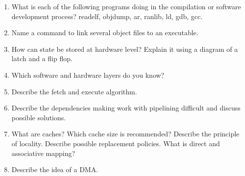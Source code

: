 \documentclass[a4paper,twocolumn]{article}
\begin{document}
\begin{enumerate}
    \item What is each of the following programs doing in the compilation
          or software development process? readelf, objdump, ar, ranlib, ld,
          gdb, gcc.
    \item Name a command to link several object files to an executable.
    \item How can state be stored at hardware level? Explain it using a diagram
          of a latch and a flip flop.
    \item Which software and hardware layers do you know?
    \item Describe the fetch and execute algorithm.
    \item Describe the dependencies making work with pipelining difficult
          and discuss possible solutions.
    \item What are caches? Which cache size is recommended? Describe the
          principle of locality. Describe possible replacement policies.
          What is direct and associative mapping?
    \item Describe the idea of a DMA.
\end{enumerate}
\end{document}
